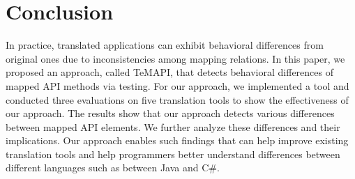 \section{Conclusion}
\label{sec:conclusion}

In practice, translated applications can exhibit behavioral differences from original ones due to inconsistencies among mapping relations. In this paper, we proposed an approach, called TeMAPI, that detects behavioral differences of mapped API methods via testing. For our approach, we implemented a tool and conducted three evaluations on five translation tools to show the effectiveness of our approach. The results show that our approach detects various differences between mapped API elements. We further analyze these differences and their implications. Our approach enables such findings that can help improve existing translation tools and help programmers better understand differences between different languages such as between Java and C\#.

